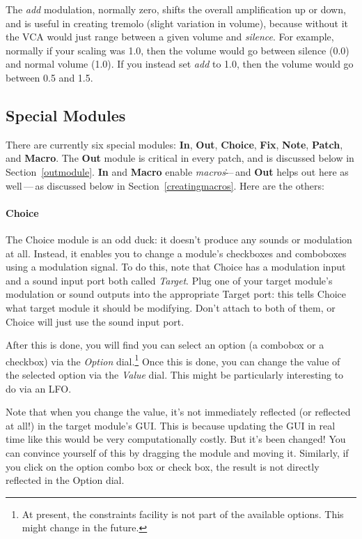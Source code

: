 \documentclass{article}
\begin{document}
The {\it add} modulation, normally zero, shifts the overall amplification up or down, and is useful in creating tremolo (slight variation in volume), because without it the VCA would just range between a given volume and {\it silence}. For example, normally if your scaling was 1.0, then the volume would go between silence (0.0) and normal volume (1.0).  If you instead set {\it add} to 1.0, then the volume would go between 0.5 and 1.5.

\subsection{Special Modules}
\label{specialmodules}

There are currently six special modules: {\bf In}, {\bf Out}, {\bf Choice}, {\bf Fix}, {\bf Note}, {\bf Patch}, and {\bf Macro}.  The {\bf Out} module is critical in every patch, and is discussed below in Section~\ref{outmodule}.  {\bf In} and {\bf Macro} enable {\it macros}\.---\,and {\bf Out} helps out here as well\,---\,as discussed below in Section~\ref{creatingmacros}.  Here are the others:

\paragraph{Choice}  The Choice module is an odd duck: it doesn't produce any sounds or modulation at all.  Instead, it enables you to change a module's checkboxes and comboboxes using a modulation signal.  To do this, note that Choice has a modulation input and a sound input port both called {\it Target}.   Plug one of your target module's modulation or sound outputs into the appropriate Target port: this tells Choice what target module it should be modifying.  Don't attach to both of them, or Choice will just use the sound input port.

After this is done, you will find you can select an option (a combobox or a checkbox) via the {\it Option} dial.\footnote{At present, the constraints facility is not part of the available options.  This might change in the future.} Once this is done, you can change the value of the selected option via the {\it Value} dial.  This might be particularly interesting to do via an LFO.

Note that when you change the value, it's not immediately reflected (or reflected at all!) in the target module's GUI.  This is because updating the GUI in real time like this would be very computationally costly.  But it's been changed!  You can convince yourself of this by dragging the module and moving it.  Similarly, if you click on the option combo box or check box, the result is not directly reflected in the Option dial.
\end{document}
